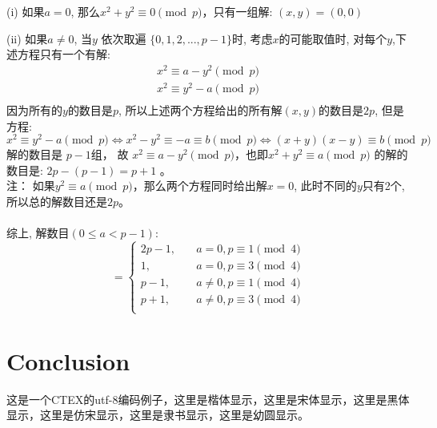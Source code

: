 \documentclass[UTF8]{article}
\begin{document}
(i) 如果$a = 0 $, 那么$x^2+y^2 \equiv 0 \pmod p$，只有一组解: $(x,y)=(0,0)$

(ii) 如果$a\ne 0 $, 当$y$ 依次取遍 $\{0,1,2,...,p-1\}$时, 考虑$x$的可能取值时, 对每个$y$,下述方程只有一个有解:\\
\begin{eqnarray*}
	x^2 \equiv a - y^2 \pmod p \\
	x^2 \equiv y^2 - a \pmod p \\
\end{eqnarray*}
因为所有的$y$的数目是$p$, 所以上述两个方程给出的所有解$(x,y)$的数目是$2p$, 但是方程:\\
$$x^2 \equiv y^2 - a \pmod p \Longleftrightarrow x^2 - y^2 \equiv - a \equiv b\pmod p \Longleftrightarrow (x+y)(x-y) \equiv b \pmod p$$
解的数目是 $p-1$组， 故 $x^2 \equiv a - y^2 \pmod p$，也即$x^2 +  y^2\equiv a  \pmod p$ 的解的数目是: $2p-(p-1) = p+1$ 。\\
注： 如果$y^2 \equiv a \pmod p$，那么两个方程同时给出解$x=0$, 此时不同的$y$只有2个,所以总的解数目还是$2p$。\\
\\
综上, 解数目$(0 \le a < p-1)$:
$$ =\left\{
\begin{aligned}
2p-1, & \quad a = 0 , p \equiv 1 \pmod 4 \\
1, &\quad  a = 0 , p \equiv 3 \pmod 4 \\
p-1, &\quad  a\ne 0 , p \equiv 1 \pmod 4 \\
p+1, &\quad  a\ne 0 , p \equiv 3 \pmod 4 \\
\end{aligned}
\right.
$$

\section{Conclusion}	
	这是一个CTEX的utf-8编码例子，{\kaishu 这里是楷体显示}，{\songti 这里是宋体显示}，{\heiti 这里是黑体显示}，{\fangsong 这里是仿宋显示}，{\lishu 这里是隶书显示}，{\youyuan 这里是幼圆显示}。
\end{document}
